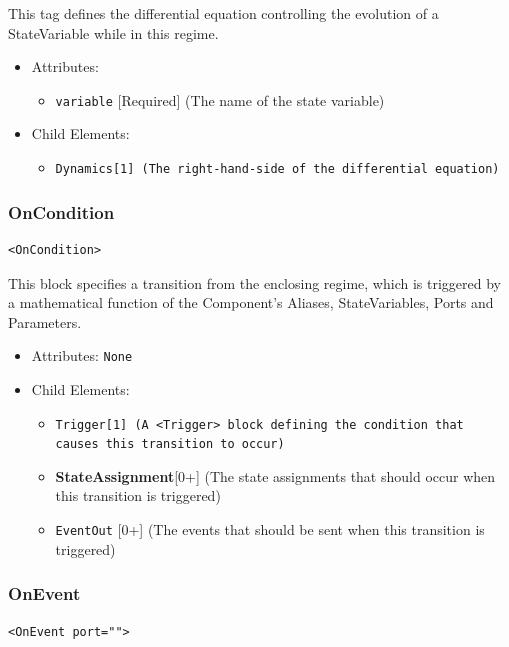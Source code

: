 \documentclass{article}
\newcommand{\MathInline}{\tt{Dynamics}}
\newcommand{\StateAssignment}{{\bf{StateAssignment}}\xspace}
\newcommand{\Trigger}{\tt{Trigger}}
\begin{document}
This tag defines the differential equation controlling the evolution of a StateVariable while
in this regime.

\begin{itemize}
\item Attributes:
%
\begin{itemize}
\item \verb|variable| {[}Required{]} (The name of the state variable)
\end{itemize}

\item Child Elements:
%
\begin{itemize}
\item \MathInline {[}1{]} (The right-hand-side of the differential equation)
\end{itemize}
\end{itemize}

\subsubsection{OnCondition}
%
\begin{lstlisting}
<OnCondition>
\end{lstlisting}

This block specifies a transition from the enclosing regime, which is triggered
by a mathematical function of the Component's Aliases, StateVariables, Ports and
Parameters.

\begin{itemize}
\item Attributes: \texttt{None}

\item Child Elements:
%
\begin{itemize}
\item \Trigger {[}1{]} (A \verb|<Trigger>| block defining the condition that causes this transition to occur)
\item \StateAssignment {[}0+{]} (The state assignments that should occur when this transition is triggered)
\item {\tt EventOut} {[}0+{]} (The events that should be sent when this transition is triggered)
\end{itemize}
\end{itemize}

\subsubsection{OnEvent}
%
\begin{lstlisting}
<OnEvent port="">
\end{lstlisting}
\end{document}

